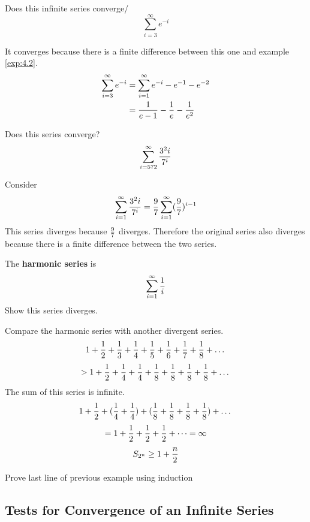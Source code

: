 \documentclass[english, 12pt]{article}
\begin{document}
\begin{exercise}
Does this infinite series converge/
\[ \sum_{i=3}^\infty e^{-i} \]
\begin{sol}
It converges because there is a finite difference between this one and example \ref{exp:4.2}.
\begin{align*}
\sum_{i=3}^\infty e^{-i} &= \sum_{i=1}^\infty e^{-i} - e^{-1} - e^{-2}\\
&=\frac{1}{e-1} - \frac{1}{e} - \frac{1}{e^2}
\end{align*}
\end{sol}
\end{exercise}
\begin{exmp}
Does this series converge?
\[\sum_{i=572}^\infty \frac{3^2i}{7^i} \]
\begin{sol}
Consider 
\[\sum_{i=1}^\infty \frac{3^2i}{7^i} = \frac{9}{7}\sum_{i=1}^\infty (\frac{9}{7})^{i-1}\]
This series diverges because $\frac{9}{7}$ diverges. Therefore the original series also diverges because there is a finite difference between the two series.
\end{sol}
\end{exmp}
\begin{exmp}
The \textbf{harmonic series} is 
\[\sum_{i=1}^\infty \frac{1}{i} \]
Show this series diverges.
\begin{sol}
Compare the harmonic series with another divergent series.
\[1 + \frac{1}{2} + \frac{1}{3} + \frac{1}{4} + \frac{1}{5}+  \frac{1}{6} + \frac{1}{7} + \frac{1}{8}+ \dots \]
\[ > 1 + \frac{1}{2} + \frac{1}{4} + \frac{1}{4} + \frac{1}{8}+  \frac{1}{8} + \frac{1}{8} + \frac{1}{8}+ \dots \]
The sum of this series is infinite.
\[ 1 + \frac{1}{2} + (\frac{1}{4} + \frac{1}{4}) + (\frac{1}{8}+  \frac{1}{8} + \frac{1}{8} + \frac{1}{8})+ \dots \]
\[= 1 + \frac{1}{2} + \frac{1}{2} + \frac{1}{2} + \dots = \infty\]
\[S_{2^n} \geq 1 + \frac{n}{2} \]

\end{sol}
\end{exmp}
\begin{exercise}
Prove last line of previous example using induction
\end{exercise}
\subsection{Tests for Convergence of an Infinite Series}
\end{document}
